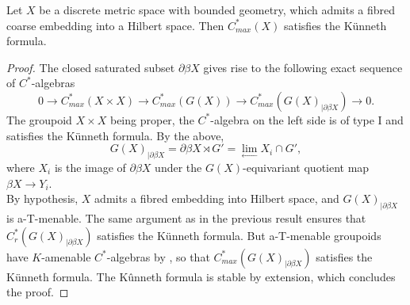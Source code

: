 \begin{satz}
		Let $X$ be a discrete metric space with bounded geometry, which admits a fibred coarse embedding into a Hilbert space. Then $C_{max}^*(X)$ satisfies the Künneth formula.
\end{satz}
\begin{proof}
The closed saturated subset $\partial \beta X$ gives rise to the following exact sequence of $C^*$-algebras
\[0 \rightarrow C_{max}^*(X\times X) \rightarrow C^*_{max}(G(X)) \rightarrow C^*_{max}(G(X)_{|\partial \beta X}) \rightarrow 0.\] 
The groupoid $X\times X$ being proper, the $C^*$-algebra on the left side is of type I and satisfies the Künneth formula. By the above, 
\[G(X)_{|\partial \beta X} = \partial \beta X \rtimes G' =\lim\limits_{\longleftarrow} X_i\cap G', \]
where $X_i$ is the image of $\partial \beta X$ under the $G(X)$-equivariant quotient map $\beta X \rightarrow Y_i$.\\

By hypothesis, $X$ admits a fibred embedding into Hilbert space, and $G(X)_{|\partial \beta X}$ is a-T-menable. The same argument as in the previous result ensures that $C^*_{r}(G(X)_{|\partial \beta X})$ satisfies the Künneth formula. But a-T-menable groupoids have $K$-amenable $C^*$-algebras by \cite{TuThese}, so that $C^*_{max}(G(X)_{|\partial \beta X})$ satisfies the Künneth formula.%
The Kûnneth formula is stable by extension, which concludes the proof.
\end{proof}